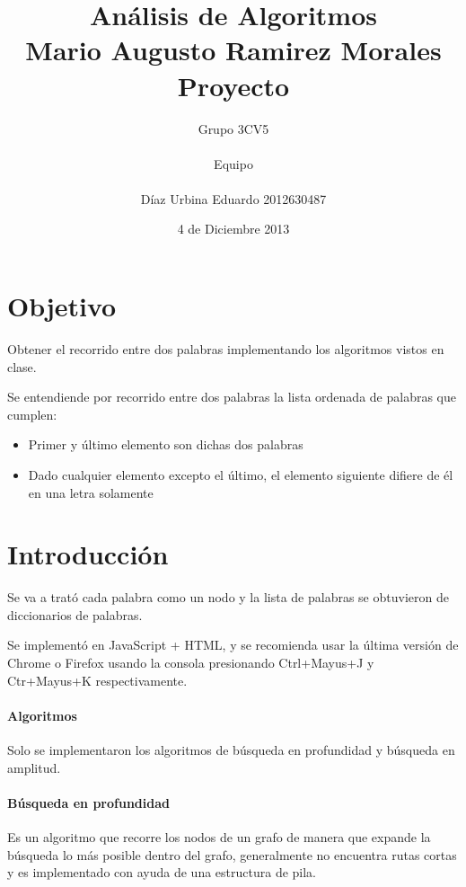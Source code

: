 \documentclass[40pt,a4paper]{article}
\begin{document}
\title{
Análisis de Algoritmos\\
{\small Mario Augusto Ramirez Morales\\}
Proyecto\\
}
\author{
Grupo 3CV5\\ \\
Equipo\\ \\
Díaz Urbina Eduardo 2012630487\\
}
\date{4 de Diciembre 2013}
\maketitle

\section{Objetivo}

Obtener el recorrido entre dos palabras implementando los algoritmos
vistos en clase.

Se entendiende por recorrido entre dos palabras la lista ordenada
de palabras que cumplen:

\begin{itemize}
	\item Primer y último elemento son dichas dos palabras
	\item Dado cualquier elemento excepto el último, el elemento
	      siguiente difiere de él en una letra solamente
\end{itemize}

\section{Introducción}

Se va a trató cada palabra como un nodo y la lista de palabras se
obtuvieron de diccionarios de palabras.

Se implementó en JavaScript + HTML, y se recomienda usar la última
versión de Chrome o Firefox usando la consola presionando
Ctrl+Mayus+J y Ctr+Mayus+K respectivamente.

\paragraph{Algoritmos}
Solo se implementaron los algoritmos de búsqueda en profundidad y
búsqueda en amplitud.

\paragraph{Búsqueda en profundidad}
Es un algoritmo que recorre los nodos de un grafo de manera que
expande la búsqueda lo más posible dentro del grafo, generalmente
no encuentra rutas cortas y es implementado con ayuda de una estructura
de pila.
\end{document}
